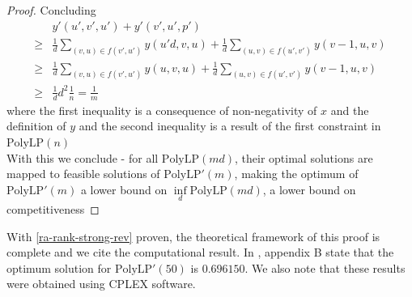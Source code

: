 \begin{proof}
	Concluding
	\begin{align*}
		     &y'(u',v',u')+y'(v',u',p')\\
		\geq & \frac{1}{d} \sum\limits_{(v,u)\in f(v',u')}y(u'd,v,u) + \frac{1}{d} \sum\limits_{(u,v)\in f(u',v')}y(v-1,u,v)\\
		\geq & \frac{1}{d} \sum\limits_{(v,u)\in f(v',u')}y(u,v,u) + \frac{1}{d} \sum\limits_{(u,v)\in f(u',v')}y(v-1,u,v)\\
		\geq & \frac{1}{d}d^2\frac{1}{n}=\frac{1}{m}
	\end{align*}
	where the first inequality is a consequence of non-negativity of $x$ and the definition of $y$ and the second inequality is a result of the first constraint in $\mathrm{PolyLP}(n)$\\

	With this we conclude - for all $\mathrm{PolyLP}(md)$, their optimal solutions are mapped to feasible solutions of $\mathrm{PolyLP'}(m)$, making the optimum of $\mathrm{PolyLP'}(m)$ a lower bound on $\inf\limits_d\mathrm{PolyLP}(md)$, a lower bound on competitiveness
\end{proof}

With \autoref{ra-rank-strong-rev} proven, the theoretical framework of this proof is complete and we cite the computational result. In \cite{obmRaRank}, appendix B state that the optimum solution for $\mathrm{PolyLP'}(50)$ is $0.696150$. We also note that these results were obtained using CPLEX software.